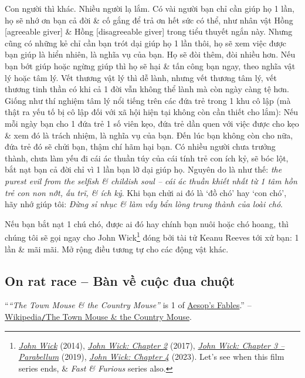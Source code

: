 \documentclass[12pt,twoside]{book}
\begin{document}
Con người thì khác. Nhiều người lạ lắm. Có vài người bạn chỉ cần giúp họ 1 lần, họ sẽ nhớ ơn bạn cả đời \& cố gắng để trả ơn hết sức có thể, như nhân vật {\sf Hồng [agreeable giver]} \& {\sf Hồng [disagreeable giver]} trong tiểu thuyết ngắn này. Nhưng cũng có những kẻ chỉ cần bạn trót dại giúp họ 1 lần thôi, họ sẽ xem việc được bạn giúp là hiển nhiên, là nghĩa vụ của bạn. Họ sẽ đòi thêm, đòi nhiều hơn. Nếu bạn bớt giúp hoặc ngừng giúp thì họ sẽ hại \& tấn công bạn ngay, theo nghĩa vật lý hoặc tâm lý. Vết thương vật lý thì dễ lành, nhưng vết thương tâm lý, vết thương tinh thần có khi cả 1 đời vẫn không thể lành mà còn ngày càng tệ hơn. Giống như thí nghiệm tâm lý nổi tiếng trên các đứa trẻ trong 1 khu cô lập (mà thật ra yếu tố bị cô lập đối với xã hội hiện tại không còn cần thiết cho lắm): Nếu mỗi ngày bạn cho 1 đứa trẻ 1 số viên kẹo, đứa trẻ dần quen với việc được cho kẹo \& xem đó là trách nhiệm, là nghĩa vụ của bạn. Đến lúc bạn không còn cho nữa, đứa trẻ đó sẽ chửi bạn, thậm chí hãm hại bạn. Có nhiều người chưa trưởng thành, chưa làm yếu đi cái ác thuần túy của cái tính trẻ con ích kỷ, sẽ bóc lột, bắt nạt bạn cả đời chỉ vì 1 lần bạn lỡ dại giúp họ. Nguyên do là như thế: {\it the purest evil from the selfish \& childish soul -- cái ác thuần khiết nhất từ 1 tâm hồn trẻ con non nớt, ấu trĩ, \& ích kỷ}. Khi bạn chửi ai đó là `đồ chó' hay `con chó', hãy nhớ giúp tôi: {\it Đừng sỉ nhục \& làm vấy bẩn lòng trung thành của loài chó}.

Nếu bạn bắt nạt 1 chú chó, được ai đó hay chính bạn nuôi hoặc chó hoang, thì chúng tôi sẽ gọi ngay cho {\sf John Wick}\footnote{\href{https://www.imdb.com/title/tt2911666}{\it John Wick} (2014), \href{https://www.imdb.com/title/tt4425200}{\it John Wick: Chapter 2} (2017), \href{https://www.imdb.com/title/tt6146586}{\it John Wick: Chapter 3 -- Parabellum} (2019), \href{https://www.imdb.com/title/tt10366206}{\it John Wick: Chapter 4} (2023). Let's see when this film series ends, \& {\it Fast \& Furious} series also.} đóng bởi tài tử {\sc Keanu Reeves} tới xử bạn: 1 lần \& mãi mãi. Mở rộng điều tương tự cho các động vật khác.

\subsection{On rat race -- Bàn về cuộc đua chuột}

``{\it``The Town Mouse \& the Country Mouse''} is 1 of \href{https://en.wikipedia.org/wiki/Aesop%27s_Fables}{Aesop's Fables}.'' -- \href{https://en.wikipedia.org/wiki/The_Town_Mouse_and_the_Country_Mouse}{Wikipedia{\tt/}The Town Mouse \& the Country Mouse}.
\end{document}
